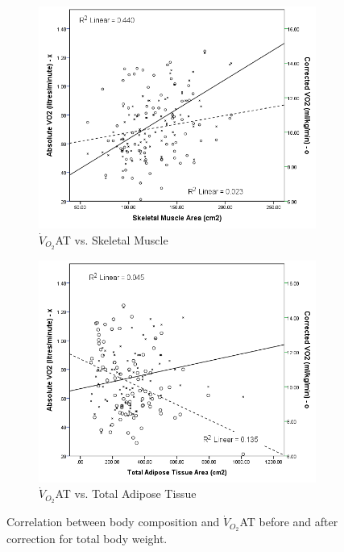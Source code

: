 \begin{figure}[htb]
	\centering
	\begin{subfigure}[b]{0.45\textwidth}
		\centering
		\includegraphics[width=\textwidth]{Figures/bc_scatter_VO2_skeletal}
		\caption{$\dot{V}_{O_2}$AT vs. 
Skeletal Muscle}
		\label{fig:bc_scatter_VO2_skeletal}
	\end{subfigure}
	\hfill
	\begin{subfigure}[b]{0.45\textwidth}
		\centering
		\includegraphics[width=\textwidth]{Figures/bc_scatter_VO2_TAT}
		\caption{$\dot{V}_{O_2}$AT vs. 
Total Adipose Tissue}
		\label{fig:bc_scatter_VO2_TAT}
	\end{subfigure}
	\caption{Correlation between body composition and $\dot{V}_{O_2}$AT before and after correction for total body weight.}	
	\label{fig:bc_scatter_VO2_bodycomp_reversal}
\end{figure}

